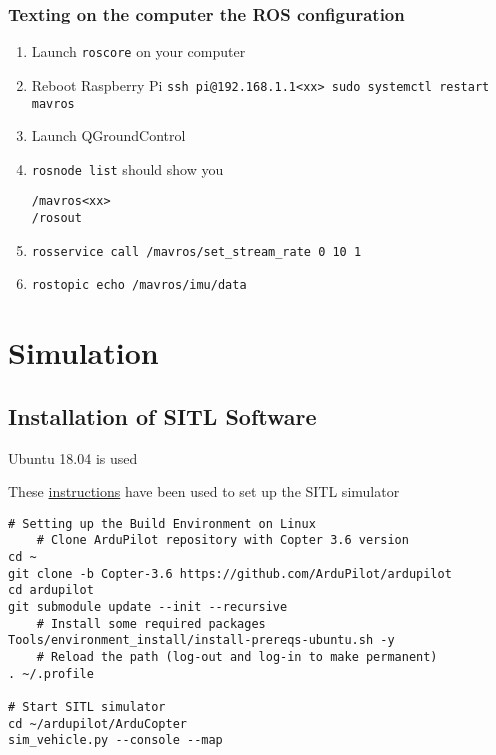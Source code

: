             \subsubsection{Texting on the computer the ROS configuration}
                \begin{enumerate}
                    \item Launch \texttt{roscore} on your computer
                    \item Reboot Raspberry Pi \texttt{ssh pi@192.168.1.1<xx> sudo systemctl restart mavros}
                    \item Launch QGroundControl
                    \item \texttt{rosnode list} should show you
                
                    \begin{verbatim}
/mavros<xx>
/rosout
                    \end{verbatim}
                    \item \texttt{rosservice call /mavros/set\_stream\_rate 0 10 1}
                    \item \texttt{rostopic echo /mavros/imu/data}
                \end{enumerate}

    \section{Simulation}
        
        \subsection{Installation of SITL Software}
            Ubuntu 18.04 is used
            
            These \href{http://ardupilot.org/dev/docs/setting-up-sitl-on-linux.html}{instructions} have been used to set up the SITL simulator
            
            \begin{verbatim}
# Setting up the Build Environment on Linux
    # Clone ArduPilot repository with Copter 3.6 version
cd ~
git clone -b Copter-3.6 https://github.com/ArduPilot/ardupilot
cd ardupilot
git submodule update --init --recursive
    # Install some required packages
Tools/environment_install/install-prereqs-ubuntu.sh -y
    # Reload the path (log-out and log-in to make permanent)
. ~/.profile

# Start SITL simulator
cd ~/ardupilot/ArduCopter
sim_vehicle.py --console --map
            \end{verbatim}
            
